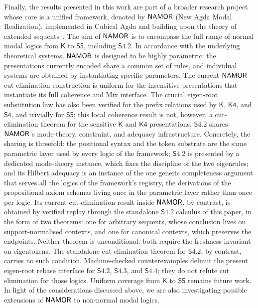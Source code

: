 \documentclass{article}
\newcommand{\logic}{\mathsf{S4.2}}
\newcommand{\axname}[1]{\mathsf{#1}}
\newcommand{\agda}{\textsf{Agda}}
\theoremstyle{definition}
\begin{document}
Finally, the results presented in this work are part of a broader research project whose core is a unified framework, denoted by $\mathsf{NAMOR}$ (\textsf{New Agda Modal Realization}), implemented in Cubical \agda{} and building upon the theory of extended sequents~\cite{Martini2023:CutElimination}. The aim of $\mathsf{NAMOR}$ is to encompass the full range of normal modal logics from $\mathsf{K}$ to $\mathsf{S5}$, including $\logic$. In accordance with the underlying theoretical systems, $\mathsf{NAMOR}$ is designed to be highly parametric: the presentations currently encoded share a common set of rules, and individual systems are obtained by instantiating specific parameters. The current $\mathsf{NAMOR}$ cut-elimination construction is uniform for the insensitive presentations that instantiate its full coherence and Mix interface. The crucial eigen-root substitution law has also been verified for the prefix relations used by $\axname{K}$, $\axname{K4}$, and $\axname{S4}$, and trivially for $\axname{S5}$; this local coherence result is not, however, a cut-elimination theorem for the sensitive $\axname{K}$ and $\axname{K4}$ presentations. $\logic$ shares $\mathsf{NAMOR}$'s mode-theory, constraint, and adequacy infrastructure. Concretely, the sharing is threefold: the positional syntax and the token substrate are the same parametric layer used by every logic of the framework; $\logic$ is presented by a dedicated mode-theory instance, which fixes the discipline of the two eigenrules; and its Hilbert adequacy is an instance of the one generic completeness argument that serves all the logics of the framework's registry, the derivations of the propositional axiom schemas living once in the parametric layer rather than once per logic. Its current cut-elimination result inside $\mathsf{NAMOR}$, by contrast, is obtained by verified replay through the standalone $\logic$ calculus of this paper, in the form of two theorems: one for arbitrary sequents, whose conclusion lives on support-normalised contexts, and one for canonical contexts, which preserves the endpoints. Neither theorem is unconditional: both require the freshness invariant on eigentokens. The standalone cut-elimination theorem for $\logic$, by contrast, carries no such condition. Machine-checked counterexamples delimit the present eigen-root rebase interface for $\logic$, $\axname{S4.3}$, and $\axname{S4.4}$; they do not refute cut elimination for those logics. Uniform coverage from $\axname{K}$ to $\axname{S5}$ remains future work. In light of the considerations discussed above, we are also investigating possible extensions of $\mathsf{NAMOR}$ to non-normal modal logics.
\end{document}
